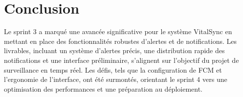 \section*{Conclusion}
Le sprint 3 a marqué une avancée significative pour le système VitalSync en mettant en place des fonctionnalités robustes d’alertes et de notifications. Les livrables, incluant un système d’alertes précis, une distribution rapide des notifications et une interface préliminaire, s’alignent sur l’objectif du projet de surveillance en temps réel. Les défis, tels que la configuration de FCM et l’ergonomie de l’interface, ont été surmontés, orientant le sprint 4 vers une optimisation des performances et une préparation au déploiement.